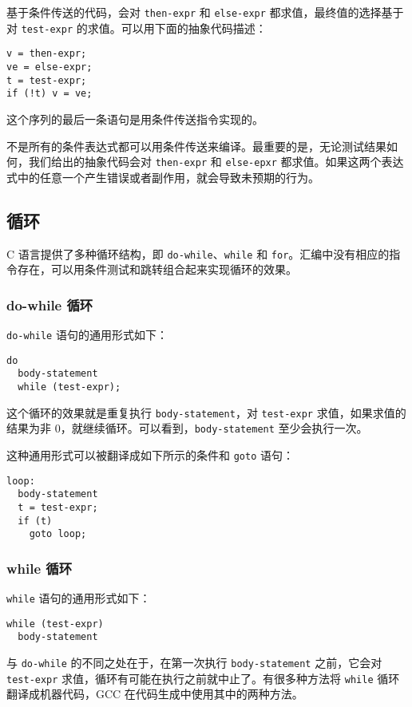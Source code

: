 基于条件传送的代码，会对 \verb|then-expr| 和 \verb|else-expr| 都求值，最终值的选择基于对 \verb|test-expr| 的求值。可以用下面的抽象代码描述：
\begin{verbatim}
v = then-expr;
ve = else-expr;
t = test-expr;
if (!t) v = ve;
\end{verbatim}
这个序列的最后一条语句是用条件传送指令实现的。

不是所有的条件表达式都可以用条件传送来编译。最重要的是，无论测试结果如何，我们给出的抽象代码会对 \verb|then-expr| 和 \verb|else-epxr| 都求值。如果这两个表达式中的任意一个产生错误或者副作用，就会导致未预期的行为。

\subsection{循环}

C 语言提供了多种循环结构，即 \verb|do-while|、\verb|while| 和 \verb|for|。汇编中没有相应的指令存在，可以用条件测试和跳转组合起来实现循环的效果。

\subsubsection{do-while 循环}

\verb|do-while| 语句的通用形式如下：
\begin{verbatim}
do
  body-statement
  while (test-expr);
\end{verbatim}
这个循环的效果就是重复执行 \verb|body-statement|，对 \verb|test-expr| 求值，如果求值的结果为非 0，就继续循环。可以看到，\verb|body-statement| 至少会执行一次。

这种通用形式可以被翻译成如下所示的条件和 \verb|goto| 语句：
\begin{verbatim}
loop:
  body-statement
  t = test-expr;
  if (t)
    goto loop;
\end{verbatim}

\subsubsection{while 循环}

\verb|while| 语句的通用形式如下：
\begin{verbatim}
while (test-expr)
  body-statement
\end{verbatim}
与 \verb|do-while| 的不同之处在于，在第一次执行 \verb|body-statement| 之前，它会对 \verb|test-expr| 求值，循环有可能在执行之前就中止了。有很多种方法将 \verb|while| 循环翻译成机器代码，GCC 在代码生成中使用其中的两种方法。

